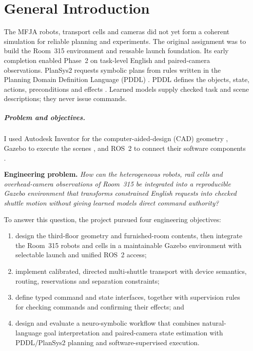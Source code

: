 \chapter{General Introduction}
\label{chap:introduction}

The MFJA robots, transport cells and cameras did not yet form a coherent
simulation for reliable planning and experiments. The original assignment was
to build the Room~315 environment and reusable launch foundation. Its early
completion enabled Phase~2 on task-level English and paired-camera observations.
PlanSys2 requests symbolic plans from rules written in the Planning Domain
Definition Language (PDDL) \citep{plansys2}. PDDL defines the objects, state,
actions, preconditions and effects \citep{pddl}. Learned models supply checked
task and scene descriptions; they never issue commands.

\paragraph{Problem and objectives.}

I used Autodesk Inventor for the computer-aided-design (CAD) geometry
\citep{autodeskinventor}, Gazebo to execute the scenes
\citep{gazeboharmonic}, and ROS~2 to connect their software components
\citep{ros2jazzyinterfaces}.

\noindent\textbf{Engineering problem.} \emph{How can the heterogeneous robots,
rail cells and overhead-camera observations of Room~315 be integrated into a
reproducible Gazebo environment that transforms constrained English requests
into checked shuttle motion without giving learned models direct command
authority?}

To answer this question, the project pursued four engineering objectives:

\begin{enumerate}[label=\textbf{O\arabic*.},leftmargin=*,itemsep=0.22em]
  \item design the third-floor geometry and furnished-room contents, then
  integrate the Room~315 robots and cells in a maintainable Gazebo environment
  with selectable launch and unified ROS~2 access;
  \item implement calibrated, directed multi-shuttle transport with device
  semantics, routing, reservations and separation constraints;
  \item define typed command and state interfaces, together with supervision
  rules for checking commands and confirming their effects; and
  \item design and evaluate a neuro-symbolic workflow that combines
  natural-language goal interpretation and paired-camera state estimation with
  PDDL/PlanSys2 planning and software-supervised execution.
\end{enumerate}

